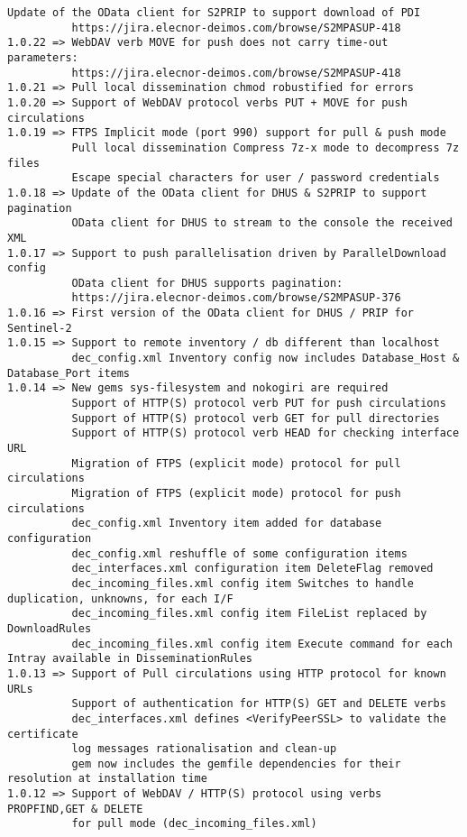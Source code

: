 \documentclass[dec_sum_main.tex]{subfiles}
\begin{document}
\begin{Verbatim}[tabsize=4]
          Update of the OData client for S2PRIP to support download of PDI
          https://jira.elecnor-deimos.com/browse/S2MPASUP-418
1.0.22 => WebDAV verb MOVE for push does not carry time-out parameters:
          https://jira.elecnor-deimos.com/browse/S2MPASUP-418
1.0.21 => Pull local dissemination chmod robustified for errors
1.0.20 => Support of WebDAV protocol verbs PUT + MOVE for push circulations
1.0.19 => FTPS Implicit mode (port 990) support for pull & push mode
          Pull local dissemination Compress 7z-x mode to decompress 7z files
          Escape special characters for user / password credentials
1.0.18 => Update of the OData client for DHUS & S2PRIP to support pagination
          OData client for DHUS to stream to the console the received XML
1.0.17 => Support to push parallelisation driven by ParallelDownload config
          OData client for DHUS supports pagination:
          https://jira.elecnor-deimos.com/browse/S2MPASUP-376
1.0.16 => First version of the OData client for DHUS / PRIP for Sentinel-2
1.0.15 => Support to remote inventory / db different than localhost
          dec_config.xml Inventory config now includes Database_Host & Database_Port items
1.0.14 => New gems sys-filesystem and nokogiri are required
          Support of HTTP(S) protocol verb PUT for push circulations
          Support of HTTP(S) protocol verb GET for pull directories
          Support of HTTP(S) protocol verb HEAD for checking interface URL
          Migration of FTPS (explicit mode) protocol for pull circulations
          Migration of FTPS (explicit mode) protocol for push circulations
          dec_config.xml Inventory item added for database configuration
          dec_config.xml reshuffle of some configuration items
          dec_interfaces.xml configuration item DeleteFlag removed
          dec_incoming_files.xml config item Switches to handle duplication, unknowns, for each I/F
          dec_incoming_files.xml config item FileList replaced by DownloadRules
          dec_incoming_files.xml config item Execute command for each Intray available in DisseminationRules
1.0.13 => Support of Pull circulations using HTTP protocol for known URLs
          Support of authentication for HTTP(S) GET and DELETE verbs
          dec_interfaces.xml defines <VerifyPeerSSL> to validate the certificate
          log messages rationalisation and clean-up
          gem now includes the gemfile dependencies for their resolution at installation time
1.0.12 => Support of WebDAV / HTTP(S) protocol using verbs PROPFIND,GET & DELETE
          for pull mode (dec_incoming_files.xml)

\end{Verbatim}
\end{document}
